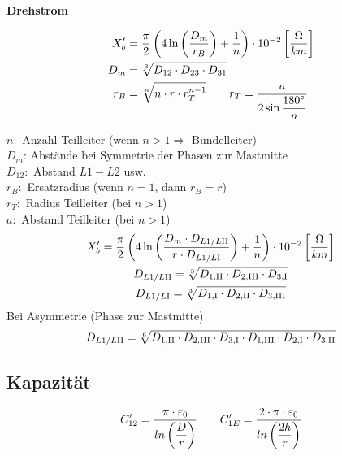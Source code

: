 \begin{itemize}
\textbf{Drehstrom}

\begin{align*}
    X_{b}' &= \frac{\pi}{2} \left( 4 \ln \left( \frac{D_{m}}{r_B}\right) +\frac{1}{n} \right) \cdot 10 ^{-2}   \left[\frac{\Omega}{km}\right]\\
    \vspace{5pt}
    D_{m} &= \sqrt[3]{D_{12} \cdot D_{23} \cdot D_{31}}\\
    r_B &= \sqrt[n]{n \cdot r \cdot r_{T}^{n-1}} \qquad
    r_T = \frac{a}{2 \sin \dfrac{180 \degree}{n}}
\end{align*}

$n:$ Anzahl Teilleiter (wenn $n>1 \Rightarrow$ Bündelleiter)\\
$D_m$: Abstände bei Symmetrie der Phasen zur Mastmitte\\
$D_{12}:$ Abstand $L1 - L2$ usw.\\
$r_B:$ Ersatzradius (wenn $n=1$, dann $r_B = r$)\\
$r_T:$ Radius Teilleiter (bei $n>1$)\\
$a:$ Abstand Teilleiter (bei $n>1$)\\



\begin{gather*}
    X_{b}' = \frac{\pi}{2} \left( 4 \ln \left( \frac{D_{m} \cdot D_{L1/L\RN{2}}}{r \cdot D_{L1/L\RN{1}}}\right) + \frac{1}{n} \right) \cdot 10 ^{-2}   \left[\frac{\Omega}{km}\right]\\
    D_{L1/L\RN{2}} = \sqrt[3]{D_{1,\RN{2}} \cdot D_{2,\RN{3}} \cdot D_{3,\RN{1}}}\\
    D_{L1/L\RN{1}} = \sqrt[3]{D_{1,\RN{1}} \cdot D_{2,\RN{2}} \cdot D_{3,\RN{3}}}
\end{gather*}
Bei Asymmetrie (Phase zur Mastmitte)
\begin{equation*}
    D_{L1/L\RN{2}} = \sqrt[6]{D_{1,\RN{2}} \cdot D_{2,\RN{3}} \cdot D_{3,\RN{1}} \cdot D_{1,\RN{3}} \cdot D_{2,\RN{1}} \cdot D_{3,\RN{2}}}
\end{equation*}

\subsection{Kapazität}
    \begin{equation*}
        C'_{12} = \frac{\pi \cdot \varepsilon_0}{ln\left(\dfrac{D}{r} \right)} \qquad
        C'_{1E} = \frac{2 \cdot \pi \cdot \varepsilon_0}{ln \left( \dfrac{2h}{r} \right)}\\
    \end{equation*}


\end{itemize}
